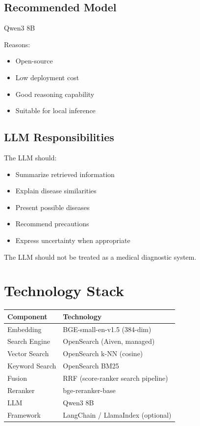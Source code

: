 \documentclass[11pt,a4paper]{article}
\begin{document}
\subsection{Recommended Model}

Qwen3 8B

Reasons:

\begin{itemize}
    \item Open-source
    \item Low deployment cost
    \item Good reasoning capability
    \item Suitable for local inference
\end{itemize}

\subsection{LLM Responsibilities}

The LLM should:

\begin{itemize}
    \item Summarize retrieved information
    \item Explain disease similarities
    \item Present possible diseases
    \item Recommend precautions
    \item Express uncertainty when appropriate
\end{itemize}

The LLM should not be treated as a medical diagnostic system.

\section{Technology Stack}

\begin{center}
    \begin{tabular}{|l|l|}
        \hline
        Component      & Technology                         \\
        \hline
        Embedding      & BGE-small-en-v1.5 (384-dim)        \\
        Search Engine  & OpenSearch (Aiven, managed)        \\
        Vector Search  & OpenSearch k-NN (cosine)           \\
        Keyword Search & OpenSearch BM25                    \\
        Fusion         & RRF (score-ranker search pipeline) \\
        Reranker       & bge-reranker-base                  \\
        LLM            & Qwen3 8B                           \\
        Framework      & LangChain / LlamaIndex (optional)  \\
        \hline
    \end{tabular}
\end{center}
\end{document}

